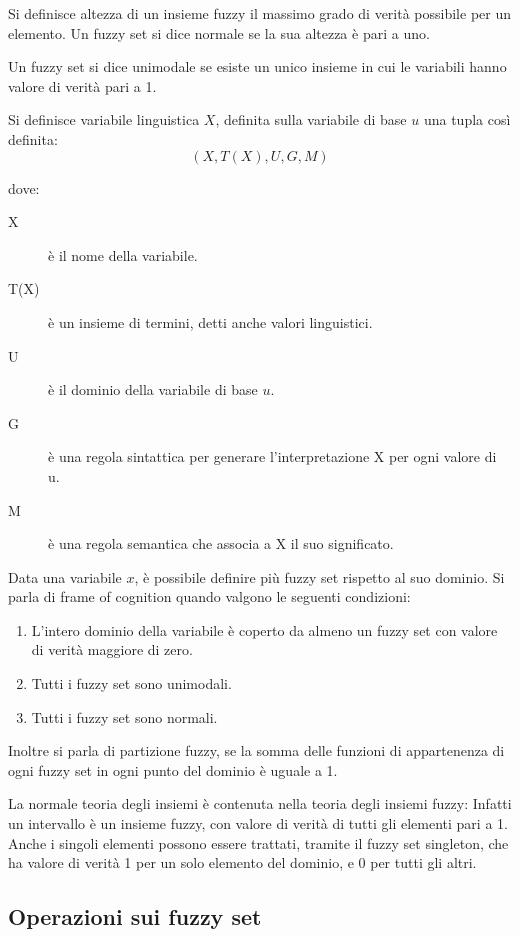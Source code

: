 Si definisce altezza di un insieme fuzzy il massimo grado di verità possibile per un elemento.
Un fuzzy set si dice normale se la sua altezza è pari a uno.

Un fuzzy set si dice unimodale se esiste un unico insieme in cui le variabili hanno valore di verità pari a 1.


Si definisce variabile linguistica $X$, definita sulla variabile di base $u$ una tupla così definita:
\begin{equation*}
(X, T(X), U, G, M)
\end{equation*}

dove:

\begin{description}
 \item [X] è il nome della variabile.
 \item [T(X)] è un insieme di termini, detti anche valori linguistici.
 \item [U] è il dominio della variabile di base $u$.
 \item [G] è una regola sintattica per generare l'interpretazione X per ogni valore di u.
 \item [M] è una regola semantica che associa a X il suo significato.
\end{description}


Data una variabile $x$, è possibile definire più fuzzy set rispetto al suo dominio. Si parla di frame of cognition quando valgono le seguenti condizioni:
\begin{enumerate}
 \item L'intero dominio della variabile è coperto da almeno un fuzzy set con valore di verità maggiore di zero.
 \item Tutti i fuzzy set sono unimodali.
 \item Tutti i fuzzy set sono normali.
\end{enumerate}

Inoltre si parla di partizione fuzzy, se la somma delle funzioni di appartenenza di ogni fuzzy set in ogni punto del dominio è uguale a 1.

La normale teoria degli insiemi è contenuta nella teoria degli insiemi fuzzy: Infatti un intervallo è un insieme fuzzy, con valore di verità di tutti gli elementi pari a 1. Anche i singoli elementi possono essere trattati, tramite il fuzzy set singleton, che ha valore di verità 1 per un solo elemento del dominio, e 0 per tutti gli altri.

\subsection{Operazioni sui fuzzy set}

